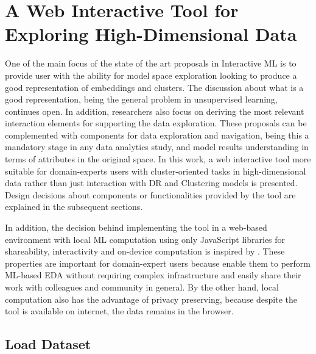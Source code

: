\chapter{A Web Interactive Tool for Exploring High-Dimensional Data}
\label{chapter4}

\graphicspath{{Chapter4/figs/}}

One of the main focus of the state of the art proposals in Interactive ML is to provide user with the ability for model space exploration looking to produce a good representation of embeddings and clusters. The discussion about what is a good representation, being the general problem in unsupervised learning, continues open. In addition, researchers also focus on deriving the most relevant interaction elements for supporting the data exploration. These proposals can be complemented with components for data exploration and navigation, being this a mandatory stage in any data analytics study, and model results understanding in terms of attributes in the original space.  In this work, a web interactive tool more suitable for domain-experts users with cluster-oriented tasks in high-dimensional data rather than just interaction with DR and Clustering models is presented. Design decisions about components or functionalities provided by the tool are explained in the subsequent sections. 

In addition, the decision behind implementing the tool in a web-based environment with local ML computation using only JavaScript libraries for shareability, interactivity and on-device computation is inspired by \cite{Smilkov2019TensorFlow.js:Beyond}. These properties are important for domain-expert users because enable them to perform ML-based EDA without requiring complex infrastructure and easily share their work with colleagues and community in general. By the other hand, local computation also has the advantage of privacy preserving, because despite the tool is available on internet, the data remains in the browser. 

\section{Load Dataset}
\label{load-dataset-section}

